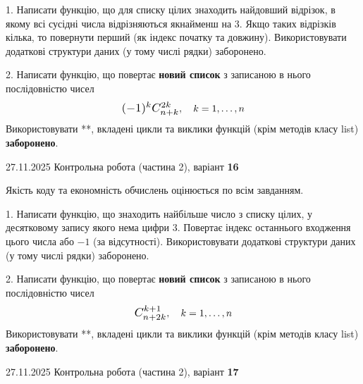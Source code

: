 \documentclass[11pt, ukrainian]{article}
\begin{document}
{{{{{{{{{{{{{{{\begin {large}
1. Написати функцію, що для списку цілих знаходить найдовший відрізок, в якому всі сусідні числа відрізняються якнайменш на 3. Якщо таких відрізків кілька, то повернути перший (як індекс початку та довжину). Використовувати додаткові структури даних (у тому числі рядки) заборонено.


2. 
Написати функцію, що повертає \textbf{новий список} з записаною в нього послідовністю чисел
$$\scalebox{1.2}{$(-1)^{k}C_{n+k}^{2k}$}, \quad k=1,\ldots,n$$
Використовувати **, вкладені цикли та виклики функцій (крім методів класу list) \textbf{заборонено}.

\end{large}
\newpage
{{27.11.2025 Контрольна робота  (частина 2), варіант  \No \textbf { 16 }\par}}


{
\begin {large}
Якість коду та економність обчислень оцінюється по всім завданням.


1. Написати функцію, що знаходить найбільше число з списку цілих, у десятковому запису якого нема цифри 3. Повертає індекс останнього входження цього числа або $-1$ (за відсутності). Використовувати додаткові структури даних (у тому числі рядки) заборонено.


2. 
Написати функцію, що повертає \textbf{новий список} з записаною в нього послідовністю чисел
$$\scalebox{1.2}{$C_{n+2k}^{k+1}$}, \quad k=1,\ldots,n$$
Використовувати **, вкладені цикли та виклики функцій (крім методів класу list) \textbf{заборонено}.

\end{large}
\newpage
{{27.11.2025 Контрольна робота  (частина 2), варіант  \No \textbf { 17 }\par}}


}}}}}}}}}}}}}}}}
\end{document}
